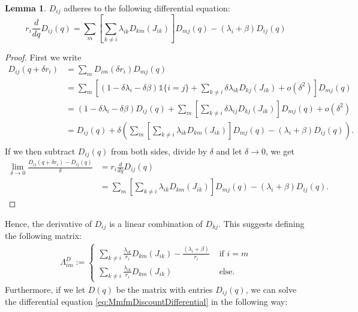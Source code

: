 \documentclass[a4paper]{thesis}
\theoremstyle{definition}
\newtheorem{lemma}{Lemma}
\begin{document}
\begin{lemma}
	$D_{ij}$ adheres to the following differential equation:
	\begin{equation}\label{eq:MmfmDiscountDifferential}
	r_i\frac{d}{dq}D_{ij}(q)=\sum\limits_m\left[\sum\limits_{k\neq i}\lambda_{ik}D_{km}(J_{ik})\right] D_{mj}(q)-(\lambda_i+\beta)D_{ij}(q)
	\end{equation}
	\begin{proof}
		First we write
		\[
		\begin{split}
		D_{ij}(q+\delta r_i)&=\sum_mD_{im}(\delta r_i)D_{mj}(q)\\
		&=\sum\limits_m\left[(1-\delta\lambda_i-\delta\beta)\mathds{1}\{i=j\}+\sum\limits_{k\neq i}\delta\lambda_{ik}D_{kj}(J_{ik})+o(\delta^2)\right]D_{mj}(q)\\
		&=(1-\delta\lambda_i-\delta\beta)D_{ij}(q)+\sum\limits_m\left[\sum\limits_{k\neq i}\delta\lambda_{ij}D_{kj}(J_{ik})\right]D_{mj}(q)+o(\delta^2)\\
		&=D_{ij}(q)+\delta\left( \sum\limits_m\left[\sum\limits_{k\neq i}\lambda_{ik}D_{km}(J_{ik})\right] D_{mj}(q)-(\lambda_i+\beta)D_{ij}(q) \right).\\
		\end{split}
		\]
		If we then subtract $D_{ij}(q)$ from both sides, divide by $\delta$ and let $\delta\rightarrow 0$, we get
		\[
		\begin{split}
		\lim\limits_{\delta\rightarrow 0}\frac{D_{ij}(q+\delta r_i)-D_{ij}(q)}{\delta}&=r_i\frac{d}{dq}D_{ij}(q)\\
		&=\sum\limits_m\left[\sum\limits_{k\neq i}\lambda_{ik}D_{km}(J_{ik})\right] D_{mj}(q)-(\lambda_i+\beta)D_{ij}(q).
		\end{split}
		\]
	\end{proof}
\end{lemma}
Hence, the derivative of $D_{ij}$ is a linear combination of $D_{kj}$.
This suggests defining the following matrix:
\begin{equation}\label{eq:MmfmDiscountGenerator}
\begin{split}
\Lambda^D_{im}:=\begin{cases}
\sum\limits_{k\neq i}\frac{\lambda_{ik}}{r_i}D_{km}(J_{ik})-\frac{(\lambda_i+\beta)}{r_i}&\text{ if }i=m\\
\sum\limits_{k\neq i}\frac{\lambda_{ik}}{r_i}D_{km}(J_{ik})&\text{ else.}
\end{cases}
\end{split}
\end{equation}
Furthermore, if we let $D(q)$ be the matrix with entries $D_{ij}(q)$, we can solve the differential equation \eqref{eq:MmfmDiscountDifferential} in the following way:
\end{document}
